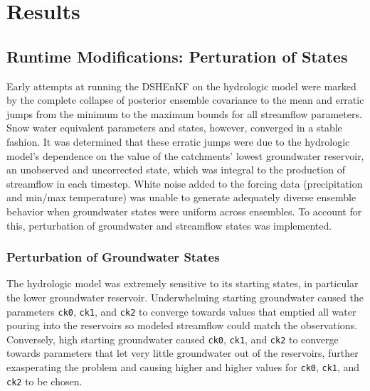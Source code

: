 \chapter{Results}

\section{Runtime Modifications: Perturation of States}
\label{sec:perturbation_of_states}
Early attempts at running the DSHEnKF on the hydrologic model were marked by the complete collapse of posterior ensemble covariance to the mean and erratic jumps from the minimum to the maximum bounds for all streamflow parameters. Snow water equivalent parameters and states, however, converged in a stable fashion. It was determined that these erratic jumps were due to the hydrologic model's dependence on the value of the catchments' lowest groundwater reservoir, an unobserved and uncorrected state, which was integral to the production of streamflow in each timestep. White noise added to the forcing data (precipitation and min/max temperature) was unable to generate adequately diverse ensemble behavior when groundwater states were uniform across ensembles. To account for this, perturbation of groundwater and streamflow states was implemented.

\subsection{Perturbation of Groundwater States}

The hydrologic model was extremely sensitive to its starting states, in particular the lower groundwater reservoir. Underwhelming starting groundwater caused the parameters \texttt{ck0}, \texttt{ck1}, and \texttt{ck2} to converge towards values that emptied all water pouring into the reservoirs so modeled streamflow could match the observations. Conversely, high starting groundwater caused \texttt{ck0}, \texttt{ck1}, and \texttt{ck2} to converge towards parameters that let very little groundwater out of the reservoirs, further exasperating the problem and causing higher and higher values for \texttt{ck0}, \texttt{ck1}, and \texttt{ck2} to be chosen. 

